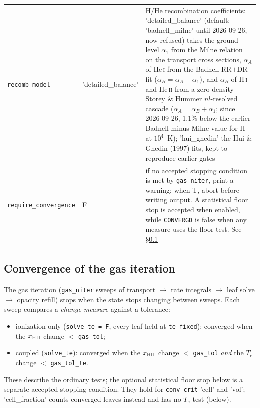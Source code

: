 \documentclass[english,a4paper]{my_memo}
\newcommand{\code}[1]{\texttt{#1}}
\begin{document}
{\begin{longtable}{llp{7.2cm}}
\code{recomb\_model} & 'detailed\_balance' & H/He recombination coefficients: 'detailed\_balance' (default; 'badnell\_milne' until 2026-09-26, now refused) takes the ground-level $\alpha_1$ from the Milne relation on the transport cross sections, $\alpha_A$ of He\,\textsc{i} from the Badnell RR$+$DR fit ($\alpha_B = \alpha_A - \alpha_1$), and $\alpha_B$ of H\,\textsc{i} and He\,\textsc{ii} from a zero-density Storey \& Hummer $nl$-resolved cascade ($\alpha_A = \alpha_B + \alpha_1$; since 2026-09-26, 1.1\% below the earlier Badnell-minus-Milne value for H at $10^4$~K); 'hui\_gnedin' the Hui \& Gnedin (1997) fits, kept to reproduce earlier gates \\
\code{require\_convergence} & F & if no accepted stopping condition is met by \code{gas\_niter}, print a warning; when T, abort before writing output.  A statistical floor stop is accepted when enabled, while \code{CONVERGD} is false when any measure uses the floor test.  See \S\ref{sec:convergence} \\
\end{longtable}
}

\subsection{Convergence of the gas iteration}
\label{sec:convergence}
The gas iteration (\code{gas\_niter} sweeps of transport $\rightarrow$ rate
integrals $\rightarrow$ leaf solve $\rightarrow$ opacity refill) stops when
the state stops changing between sweeps.  Each sweep compares a \emph{change
measure} against a tolerance:
\begin{itemize}\itemsep2pt
\item ionization only (\code{solve\_te = F}, every leaf held at \code{te\_fixed}): converged when the
  $x_{\rm HII}$ change $<$ \code{gas\_tol};
\item coupled (\code{solve\_te}): converged when the $x_{\rm HII}$ change $<$
  \code{gas\_tol} \emph{and} the $T_e$ change $<$ \code{gas\_tol\_te}.
\end{itemize}
These describe the ordinary tests; the optional statistical floor stop
below is a separate accepted stopping condition.  They hold for \code{conv\_crit} 'cell' and 'vol'; 'cell\_fraction'
counts converged leaves instead and has no $T_e$ test (below).
\end{document}
